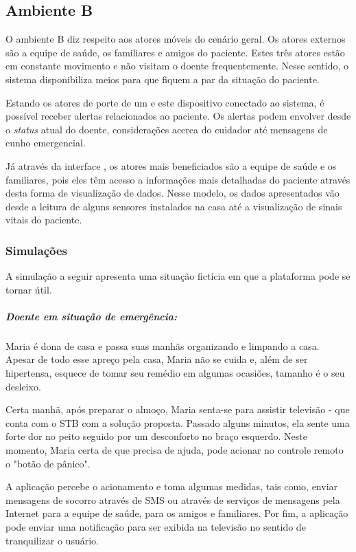 \subsection{Ambiente B} \label{subsec:ambiente-b}

O ambiente B diz respeito aos atores móveis do cenário geral. Os atores externos
são a equipe de saúde, os familiares e amigos do paciente. Estes três atores
estão em constante movimento e não visitam o doente frequentemente. Nesse
sentido, o sistema disponibiliza meios para que fiquem a par da situação do
paciente.

Estando os atores de porte de um \smartphone[] e este dispositivo conectado ao
sistema, é possível receber alertas relacionados ao paciente. Os alertas podem
envolver desde o \textit{status} atual do doente, considerações acerca do
cuidador até mensagens de cunho emergencial.

Já através da interface \web[], os atores mais beneficiados são a equipe de
saúde e os familiares, pois eles têm acesso a informações mais detalhadas do
paciente através desta forma de visualização de dados. Nesse modelo, os dados
apresentados vão desde a leitura de alguns sensores instalados na casa até a
visualização de sinais vitais do paciente.

\subsubsection{Simulações}

A simulação a seguir apresenta uma situação fictícia em que a plataforma pode
se tornar útil.

\subparagraph{Doente em situação de emergência:}

Maria é dona de casa e passa suas manhãs organizando e limpando a casa. Apesar
de todo esse apreço pela casa, Maria não se cuida e, além de ser hipertensa,
esquece de tomar seu remédio em algumas ocasiões, tamanho é o seu desleixo.

Certa manhã, após preparar o almoço, Maria senta-se para assistir televisão -
que conta com o STB com a solução proposta. Passado alguns minutos, ela sente
uma forte dor no peito seguido por um desconforto no braço esquerdo. Neste
momento, Maria certa de que precisa de ajuda, pode acionar no controle remoto o
"botão de pânico". 

A aplicação percebe o acionamento e toma algumas medidas, tais como, enviar
mensagens de socorro através de SMS ou através de serviços de mensagens pela
Internet para a equipe de saúde, para os amigos e familiares.  Por fim, a
aplicação pode enviar uma notificação para ser exibida na televisão no sentido
de tranquilizar o usuário.

